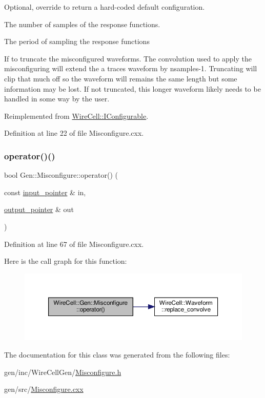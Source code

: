 Optional, override to return a hard-\/coded default configuration. 

The number of samples of the response functions.

The period of sampling the response functions

If to truncate the misconfigured waveforms. The convolution used to apply the misconfiguring will extend the a trace\textquotesingle{}s waveform by nsamples-\/1. Truncating will clip that much off so the waveform will remains the same length but some information may be lost. If not truncated, this longer waveform likely needs to be handled in some way by the user. 

Reimplemented from \hyperlink{class_wire_cell_1_1_i_configurable_a54841b2da3d1ea02189478bff96f7998}{Wire\+Cell\+::\+I\+Configurable}.



Definition at line 22 of file Misconfigure.\+cxx.

\mbox{\label{class_wire_cell_1_1_gen_1_1_misconfigure_accd856927007e514f179be951bff794b}} 
\subsubsection{\texorpdfstring{operator()()}{operator()()}}
{\footnotesize\ttfamily bool Gen\+::\+Misconfigure\+::operator() (\begin{DoxyParamCaption}\item[{const \hyperlink{class_wire_cell_1_1_i_function_node_a55c0946156df9b712b8ad1a0b59b2db6}{input\+\_\+pointer} \&}]{in,  }\item[{\hyperlink{class_wire_cell_1_1_i_function_node_afc02f1ec60d31aacddf64963f9ca650b}{output\+\_\+pointer} \&}]{out }\end{DoxyParamCaption})\hspace{0.3cm}{\ttfamily [virtual]}}



Definition at line 67 of file Misconfigure.\+cxx.

Here is the call graph for this function\+:
\nopagebreak
\begin{figure}[H]
\begin{center}
\leavevmode
\includegraphics[width=350pt]{class_wire_cell_1_1_gen_1_1_misconfigure_accd856927007e514f179be951bff794b_cgraph}
\end{center}
\end{figure}


The documentation for this class was generated from the following files\+:\begin{DoxyCompactItemize}
\item 
gen/inc/\+Wire\+Cell\+Gen/\hyperlink{_misconfigure_8h}{Misconfigure.\+h}\item 
gen/src/\hyperlink{_misconfigure_8cxx}{Misconfigure.\+cxx}\end{DoxyCompactItemize}
